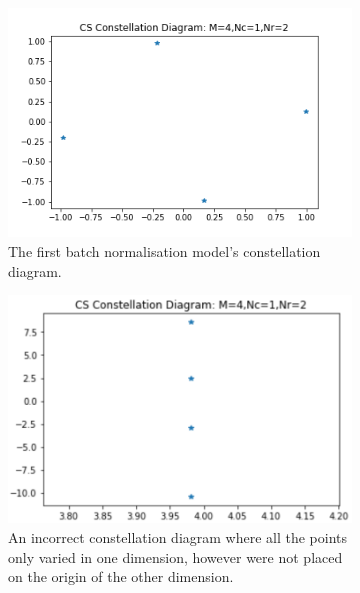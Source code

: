 \documentclass[12pt,onecolumn,letterpaper]{article}
\begin{document}
\begin{figure}[t!]
   \centering
   \begin{subfigure}[t]{0.2\textwidth}
       \centering
       \includegraphics[width=\linewidth]{figures/ae2_2_correctish_relu_const_diag.png}
       \caption{The first batch normalisation model's constellation diagram.}
   \end{subfigure}
   \hfill
   \begin{subfigure}[t]{0.2\textwidth}
       \centering
       \includegraphics[width=\linewidth]{figures/ae2_2_wrong_const_diag_1d.png}
       \caption{An incorrect constellation diagram where all the points only varied in one dimension, however were not placed on the origin of the other dimension.}
   \end{subfigure}
   \hfill
   \begin{subfigure}[t]{0.2\textwidth}
       \centering

\end{subfigure}
\end{figure}
\end{document}
